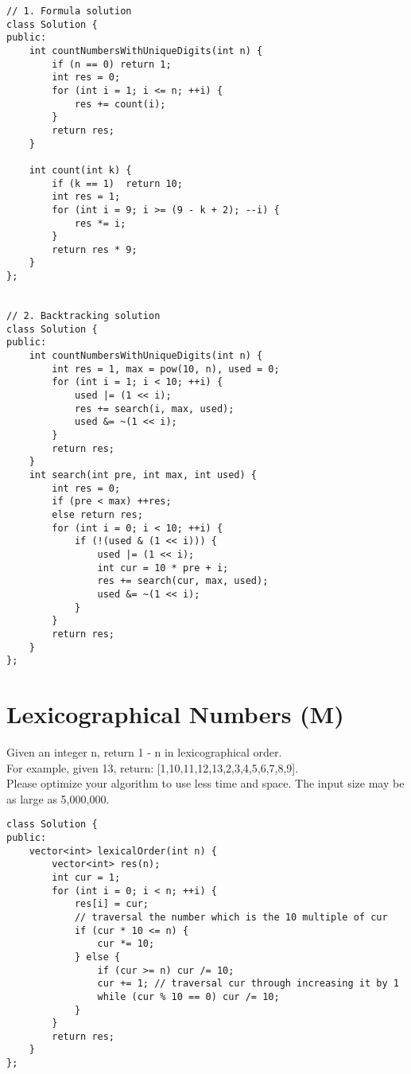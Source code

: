 \begin{lstlisting}
// 1. Formula solution
class Solution {
public:
    int countNumbersWithUniqueDigits(int n) {
        if (n == 0) return 1;
        int res = 0;
        for (int i = 1; i <= n; ++i) {
            res += count(i);
        }
        return res;
    }
    
    int count(int k) {
        if (k == 1)  return 10;
        int res = 1;
        for (int i = 9; i >= (9 - k + 2); --i) {
            res *= i;
        }
        return res * 9;
    }
};


// 2. Backtracking solution
class Solution {
public:
    int countNumbersWithUniqueDigits(int n) {
        int res = 1, max = pow(10, n), used = 0;
        for (int i = 1; i < 10; ++i) {
            used |= (1 << i);
            res += search(i, max, used);
            used &= ~(1 << i);
        }
        return res;
    }
    int search(int pre, int max, int used) {
        int res = 0;
        if (pre < max) ++res;
        else return res;
        for (int i = 0; i < 10; ++i) {
            if (!(used & (1 << i))) {
                used |= (1 << i);
                int cur = 10 * pre + i;
                res += search(cur, max, used);
                used &= ~(1 << i);
            }
        }
        return res;
    }
};
\end{lstlisting}


\section{Lexicographical Numbers (M)}
Given an integer n, return 1 - n in lexicographical order.\\

For example, given 13, return: [1,10,11,12,13,2,3,4,5,6,7,8,9].\\

Please optimize your algorithm to use less time and space. The input size may be as large as 5,000,000. \\

\begin{lstlisting}
class Solution {
public:
    vector<int> lexicalOrder(int n) {
        vector<int> res(n);
        int cur = 1;
        for (int i = 0; i < n; ++i) {
            res[i] = cur;
            // traversal the number which is the 10 multiple of cur
            if (cur * 10 <= n) { 
                cur *= 10;
            } else {
                if (cur >= n) cur /= 10;
                cur += 1; // traversal cur through increasing it by 1
                while (cur % 10 == 0) cur /= 10;
            }
        }
        return res;
    }
};
\end{lstlisting}


